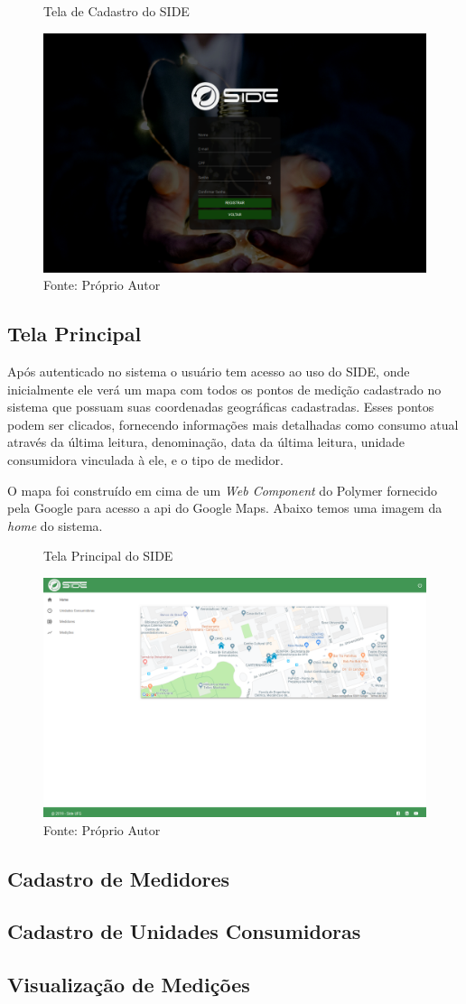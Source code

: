 \begin{figure}[H]
    \centering
    \caption{Tela de Cadastro do SIDE}
\includegraphics[width=0.7\linewidth]{imagens/side/side-cadastro.png}
    \caption*{Fonte: Próprio Autor}
    \label{fig:side-cadastro}
\end{figure}

\subsection{Tela Principal}

Após autenticado no sistema o usuário tem acesso ao uso do SIDE, onde inicialmente ele verá um mapa com todos os pontos de medição cadastrado no sistema que possuam suas coordenadas geográficas cadastradas. Esses pontos podem ser clicados, fornecendo informações mais detalhadas como consumo atual através da última leitura, denominação, data da última leitura, unidade consumidora vinculada à ele, e o tipo de medidor.

O mapa foi construído em cima de um \textit{Web Component} do Polymer fornecido pela Google para acesso a api do Google Maps. Abaixo temos uma imagem da \textit{home} do sistema.

\begin{figure}[H]
    \centering
    \caption{Tela Principal do SIDE}
\includegraphics[width=0.7\linewidth]{imagens/side/side-home.png}
    \caption*{Fonte: Próprio Autor}
    \label{fig:side-home}
\end{figure}


\subsection{Cadastro de Medidores}

\subsection{Cadastro de Unidades Consumidoras}

\subsection{Visualização de Medições}